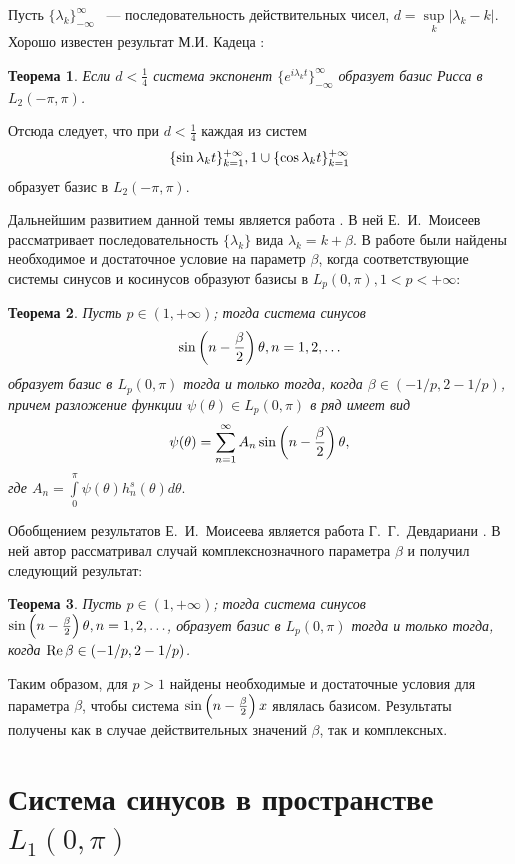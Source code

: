 \documentclass[oneside, final, 14pt]{extreport}
\newtheorem{theorem}{Теорема}
\begin{document}
Пусть $\{\lambda_k\}_{-\infty}^{\infty}$ ~--- последовательность действительных чисел, 
$d = \underset{k}{\sup}|\lambda_k - k| $.
Хорошо известен результат М.И. Кадеца \cite{kadec}:

\begin{theorem}
Если $ d < \frac{1}{4}$ система экспонент $\{e^{i\lambda_k t}\}_{-\infty}^{\infty}$ 
образует базис Рисса в $L_2(-\pi, \pi)$. 
\end{theorem}

Отсюда следует, что при $d < \frac{1}{4}$ каждая из систем 
$$
	\{\sin\lambda_kt\}_{k = 1}^{+\infty}, \thinspace\\
	1 \cup \{\cos\lambda_kt\}_{k = 1}^{+\infty}
$$
образует базис в $L_2(-\pi, \pi)$.

Дальнейшим развитием данной темы является работа \cite{moiseev-dan}.
В ней Е.~И.~Моисеев  рассматривает последовательность $\{\lambda_k\}$ вида $\lambda_k = k + \beta$.
В работе были найдены необходимое и достаточное условие на параметр $\beta$, 
когда соответствующие системы синусов и косинусов образуют базисы в $L_p(0, \pi), 1 < p < +\infty$: 

\begin{theorem}
	Пусть $p \in (1, +\infty)$; тогда система синусов $$\sin\left(n - \frac{\beta}{2}\right)\theta, n = 1, 2, \ldots$$ 
	образует базис в $L_p(0, \pi)$ тогда и только тогда, когда 
	$\beta \in (-1/p, 2 - 1/p)$, причем разложение функции $\psi(\theta) \in L_p(0, \pi)$
	в ряд имеет вид
	$$
		\psi(\theta) = \sum\limits_{n = 1}^{\infty}A_{n}\sin\left(n - \frac{\beta}{2}\right)\theta,
	$$
	где $A_n = \int\limits_0^{\pi}\psi(\theta)h_n^s(\theta)d\theta.$
\end{theorem}

Обобщением результатов Е.~И.~Моисеева является работа Г.~Г.~Девдариани \cite{devdariani}.
В ней автор рассматривал случай комплекснозначного параметра $\beta$ и получил следующий результат:
\begin{theorem}
	Пусть $p \in (1, +\infty)$; тогда система синусов $\sin\left(n - \frac{\beta}{2}\right)\theta, n = 1, 2, \ldots$, 
	образует базис в $L_p(0, \pi)$ тогда и только тогда, 
	когда $\operatorname{Re}{\beta} \in (-1/p, 2 - 1/p)$.
\end{theorem}

Таким образом, для $p > 1$ найдены необходимые и достаточные условия для параметра $\beta$,
чтобы система $\sin\left(n - \frac{\beta}{2}\right)x$ являлась базисом. Результаты получены как в случае действительных значений $\beta$, 
так и комплексных.

\section{Система синусов в пространстве $L_1(0, \pi)$}
\end{document}
